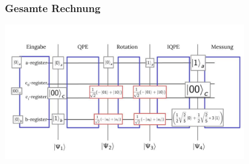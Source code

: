 \begin{frame}
    \frametitle{Gesamte Rechnung}
    \begin{center}
    \includegraphics[width=10.5cm]{img/example_circuit/example_circuit_5.jpg}
    \end{center}


\end{frame}



